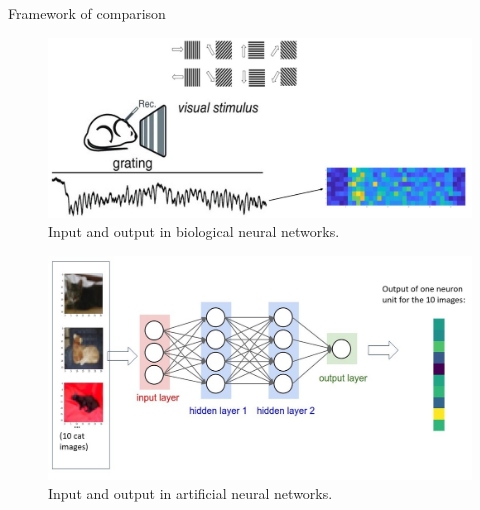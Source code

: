 \documentclass[xcolor={dvipsnames,svgnames}]{beamer}
\begin{document}
\begin{frame}{Framework of comparison}
\begin{table}[H]
\centering
 \noindent{}
\caption{Summary of comparison.} 
\end{table} 

\begin{minipage}[t]{.5\linewidth}  
    \begin{figure}
            \includegraphics[width=\textwidth]{figures/biological/biological-input-output.jpg}
            \caption{Input and output in biological neural networks.}
        \end{figure} 
    \end{minipage}
      \begin{minipage}[t]{.45\linewidth}   
      \begin{figure}         \includegraphics[width=\textwidth]{figures/artificial/artificial-input-output.jpg}
      \caption{Input and output in artificial neural networks.}
            \end{figure} 
    \end{minipage}
    
\end{frame}
\end{document}
